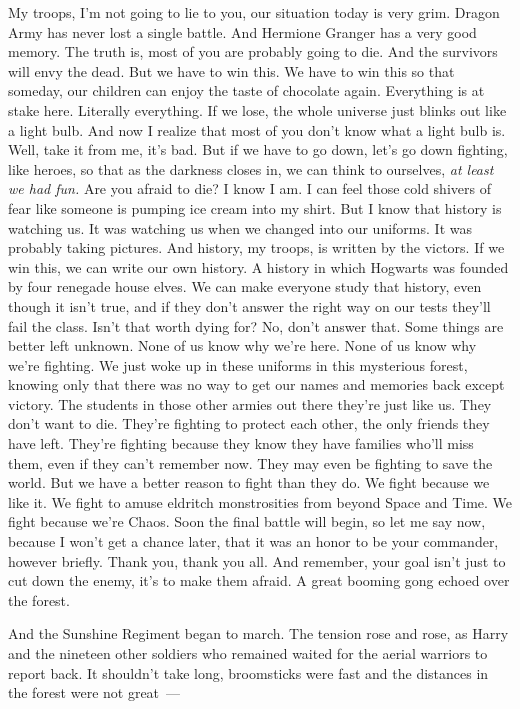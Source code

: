 My troops, I'm not going to lie to you, our situation today is very grim.
Dragon Army has never lost a single battle. And Hermione Granger{\el} has a
very good memory. The truth is, most of you are probably going to die. And the
survivors will envy the dead. But we have to win this. We have to win this so
that someday, our children can enjoy the taste of chocolate again. Everything
is at stake here. Literally everything. If we lose, the whole universe just
blinks out like a light bulb. And now I realize that most of you don't know
what a light bulb is. Well, take it from me, it's bad. But if we have to go
down, let's go down fighting, like heroes, so that as the darkness closes in,
we can think to ourselves, \emph{at least we had fun.} Are you afraid to die? I
know I am. I can feel those cold shivers of fear like someone is pumping ice
cream into my shirt. But I know{\el} that history is watching us. It was
watching us when we changed into our uniforms. It was probably taking pictures.
And history, my troops, is written by the victors. If we win this, we can write
our own history. A history in which Hogwarts was founded by four renegade house
elves. We can make everyone study that history, even though it isn't true, and
if they don't answer the right way on our tests{\el} they'll fail the class.
Isn't that worth dying for? No, don't answer that. Some things are better left
unknown. None of us know why we're here. None of us know why we're fighting. We
just woke up in these uniforms in this mysterious forest, knowing only that
there was no way to get our names and memories back except victory. The
students in those other armies out there{\el} they're just like us. They
don't want to die. They're fighting to protect each other, the only friends
they have left. They're fighting because they know they have families who'll
miss them, even if they can't remember now. They may even be fighting to save
the world. But we have a better reason to fight than they do. We fight because
we like it. We fight to amuse eldritch monstrosities from beyond Space and
Time. We fight because we're Chaos. Soon the final battle will begin, so let me
say now, because I won't get a chance later, that it was an honor to be your
commander, however briefly. Thank you, thank you all. And remember, your goal
isn't just to cut down the enemy, it's to make them afraid.
\sbreak
A great booming gong echoed over the forest.

And the Sunshine Regiment began to march.
\sbreak
The tension rose and rose, as Harry and the nineteen other soldiers who
remained waited for the aerial warriors to report back. It shouldn't take long,
broomsticks were fast and the distances in the forest were not great~---

